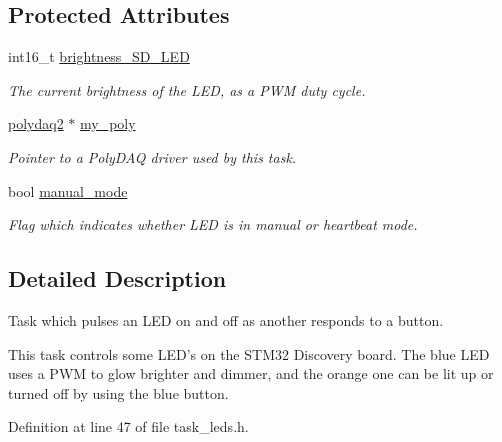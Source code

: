 \subsection*{Protected Attributes}
\begin{DoxyCompactItemize}
\item 
\hypertarget{classtask__leds_ab81a19ebec2f9bb3cd01ecddc133ba49}{int16\-\_\-t \hyperlink{classtask__leds_ab81a19ebec2f9bb3cd01ecddc133ba49}{brightness\-\_\-\-S\-D\-\_\-\-L\-E\-D}}\label{classtask__leds_ab81a19ebec2f9bb3cd01ecddc133ba49}

\begin{DoxyCompactList}\small\item\em The current brightness of the L\-E\-D, as a P\-W\-M duty cycle. \end{DoxyCompactList}\item 
\hypertarget{classtask__leds_a2a23f0cb348363f06ddb693ae7d6357c}{\hyperlink{classpolydaq2}{polydaq2} $\ast$ \hyperlink{classtask__leds_a2a23f0cb348363f06ddb693ae7d6357c}{my\-\_\-poly}}\label{classtask__leds_a2a23f0cb348363f06ddb693ae7d6357c}

\begin{DoxyCompactList}\small\item\em Pointer to a Poly\-D\-A\-Q driver used by this task. \end{DoxyCompactList}\item 
\hypertarget{classtask__leds_a0f57d30dfdf95e8d1834a69c95dd6dc5}{bool \hyperlink{classtask__leds_a0f57d30dfdf95e8d1834a69c95dd6dc5}{manual\-\_\-mode}}\label{classtask__leds_a0f57d30dfdf95e8d1834a69c95dd6dc5}

\begin{DoxyCompactList}\small\item\em Flag which indicates whether L\-E\-D is in manual or heartbeat mode. \end{DoxyCompactList}\end{DoxyCompactItemize}


\subsection{Detailed Description}
Task which pulses an L\-E\-D on and off as another responds to a button. 

This task controls some L\-E\-D's on the S\-T\-M32 Discovery board. The blue L\-E\-D uses a P\-W\-M to glow brighter and dimmer, and the orange one can be lit up or turned off by using the blue button. 

Definition at line 47 of file task\-\_\-leds.\-h.



